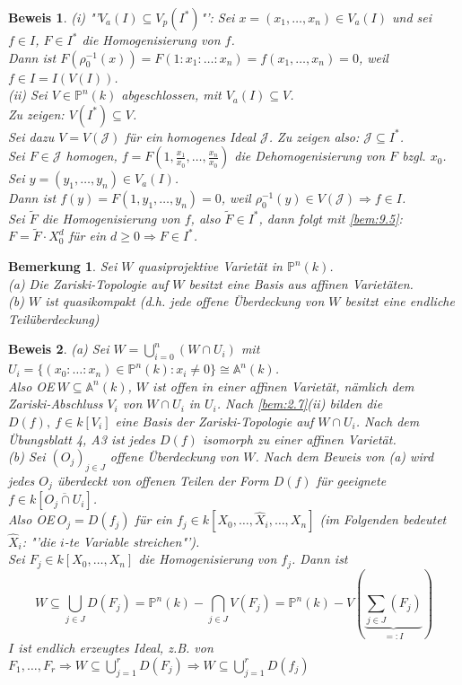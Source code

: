 \documentclass[a4paper,12pt]{report}
\theoremstyle{break}
\newtheorem{Bem}[Def]{Bemerkung}
\theoremstyle{nonumberbreak}
\theoremstyle{nonumberplain}
\newtheorem{Bew}{Beweis}
\renewcommand{\OE}{O\!\!E}
\begin{document}
\begin{Bew}
(i) "'$V_a(I)\subseteq V_p(I^*)$"': Sei $x=(x_1,\dots,x_n)\in V_a(I)$ und sei $f\in I$, $F\in I^*$ die Homogenisierung von $f$.\\
Dann ist $F(\rho_0^{-1}(x))=F(1:x_1:\dots:x_n)=f(x_1,\dots,x_n)=0$, weil $f\in I =I(V(I))$.\\
(ii) Sei $V\in \mathbb{P}^n(k)$ abgeschlossen, mit $V_a(I)\subseteq V$.\\
Zu zeigen: $V(I^*)\subseteq V$.\\
Sei dazu $V=V(\mathcal{J})$ für ein homogenes Ideal $\mathcal{J}$. Zu zeigen also: $\mathcal{J}\subseteq I^*$.\\
Sei $F\in \mathcal{J}$ homogen, $f=F(1,\frac{x_1}{x_0},\dots,\frac{x_n}{x_0})$ die Dehomogenisierung von $F$ bzgl. $x_0$.\\
Sei $y=(y_1,\dots,y_n)\in V_a(I)$.\\
Dann ist $f(y)=F(1,y_1,\dots,y_n)=0$, weil $\rho_0^{-1}(y)\in V(\mathcal{J})\Rightarrow f\in I$.\\
Sei $\tilde{F}$ die Homogenisierung von $f$, also $\tilde{F}\in I^*$, dann folgt mit \ref{bem:9.5}: $F=\tilde{F}\cdot X_0^d$ für ein $d\geq0\Rightarrow F\in I^*$.
\end{Bew}



\begin{Bem}
\label{bem:9.9}
Sei $W$ quasiprojektive Varietät in $\mathbb{P}^n(k)$.\\
(a) Die Zariski-Topologie auf $W$ besitzt eine Basis aus affinen Varietäten.\\
(b) $W$ ist quasikompakt (d.h. jede offene Überdeckung von $W$ besitzt eine endliche Teilüberdeckung)
\end{Bem}

\begin{Bew}
(a) Sei $W=\bigcup_{i=0}^n(W\cap U_i)$ mit $U_i=\{(x_0:\dots:x_n)\in\mathbb{P}^n(k):x_i\neq 0\}\cong\mathbb{A}^n(k)$.\\
Also \OE $~W\subseteq\mathbb{A}^n(k)$, $W$ ist offen in einer affinen Varietät, nämlich dem Zariski-Abschluss $V_i$ von $W\cap U_i$ in $U_i$. Nach \ref{bem:2.7}(ii) bilden die $D(f),~f\in k[V_i]$ eine Basis der Zariski-Topologie auf $W\cap U_i$. Nach dem Übungsblatt 4, A3 ist jedes $D(f)$ isomorph zu einer affinen Varietät.\\
(b) Sei $(O_j)_{j\in J}$ offene Überdeckung von $W$. Nach dem Beweis von (a) wird jedes $O_j$ überdeckt von offenen Teilen der Form $D(f)$ für geeignete $f\in k[\overline{O_j\cap U_i}]$.\\
Also \OE $~O_j=D(f_j)$ für ein $f_j\in k[X_0,\dots,\hat{X}_i,\dots,X_n]$ (im Folgenden bedeutet $\hat{X}_i$: "'die $i$-te Variable streichen"').\\
Sei $F_j\in k[X_0,\dots,X_n]$ die Homogenisierung von $f_j$. Dann ist
$$W\subseteq \bigcup_{j\in J}D(F_j)=\mathbb{P}^n(k) - \bigcap_{j\in J}V(F_j)=\mathbb{P}^n(k) - V(\underbrace{\sum_{j\in J}(F_j)}_{=:I})$$
$I$ ist endlich erzeugtes Ideal, z.B. von $F_1,\dots,F_r\Rightarrow W\subseteq\bigcup_{j=1}^rD(F_j)\Rightarrow W\subseteq \bigcup_{j=1}^rD(f_j)$
\end{Bew}
\end{document}
